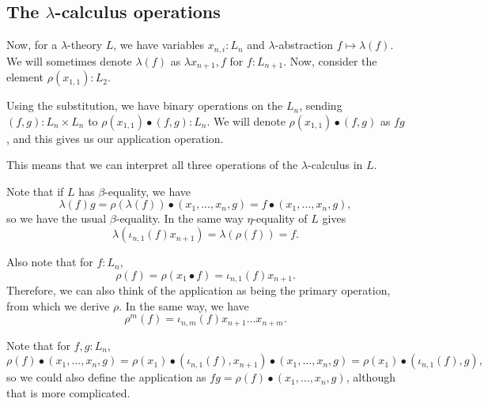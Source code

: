 \subsection{The $ \lambda $-calculus operations}\label{subsec:lambda-calculus-operations}
Now, for a $ \lambda $-theory $ L $, we have variables $ x_{n, i} : L_n $ and $ \lambda $-abstraction $ f \mapsto \lambda(f) $. We will sometimes denote $ \lambda(f) $ as $ \lambda x_{n + 1}, f $ for $ f: L_{n + 1} $. Now, consider the element $ \rho(x_{1, 1}) : L_2 $.
\begin{definition}
  Using the substitution, we have binary operations on the $ L_n $, sending $ (f, g) : L_n \times L_n $ to $ \rho(x_{1, 1}) \bullet (f, g) : L_n $. We will denote $ \rho(x_{1, 1}) \bullet (f, g) $ as $ f g $, and this gives us our application operation.
\end{definition}
This means that we can interpret all three operations of the $ \lambda $-calculus in $ L $.

\begin{remark}
  Note that if $ L $ has $ \beta $-equality, we have
  \[ \lambda(f) g = \rho(\lambda(f)) \bullet (x_1, \dots, x_n, g) = f \bullet (x_1, \dots, x_n, g), \]
  so we have the usual $ \beta $-equality. In the same way $ \eta $-equality of $ L $ gives
  \[ \lambda(\iota_{n, 1}(f) x_{n + 1}) = \lambda(\rho(f)) = f. \]
\end{remark}
\begin{remark}
  Also note that for $ f: L_n $,
  \[ \rho(f) = \rho(x_1 \bullet f) = \iota_{n, 1}(f) x_{n + 1}. \]
  Therefore, we can also think of the application as being the primary operation, from which we derive $ \rho $. In the same way, we have
  \[ \rho^m(f) = \iota_{n, m}(f) x_{n + 1} \dots x_{n + m}. \]
\end{remark}
\begin{remark}
  Note that for $ f, g : L_n $,
  \[
    \rho(f) \bullet (x_1, \dots, x_n, g)
    = \rho(x_1) \bullet (\iota_{n, 1}(f), x_{n + 1}) \bullet (x_1, \dots, x_n, g)
    = \rho(x_1) \bullet (\iota_{n, 1}(f), g),
  \]
  so we could also define the application as $ f g = \rho(f) \bullet (x_1, \dots, x_n, g) $, although that is more complicated.
\end{remark}

